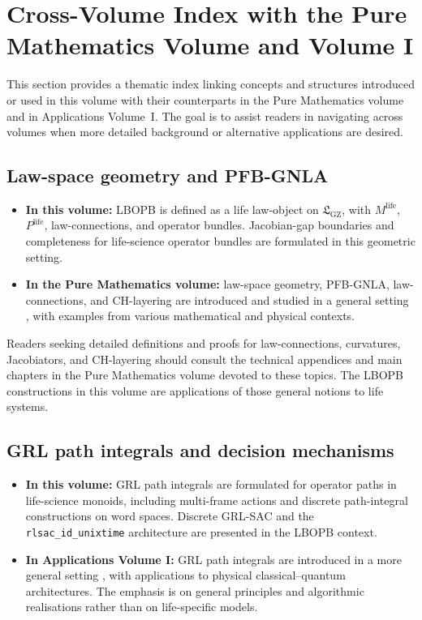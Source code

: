 \documentclass[11pt]{book}
\theoremstyle{plain}
\theoremstyle{definition}
\theoremstyle{remark}
\newcommand{\GZLS}{\ensuremath{\mathfrak{L}_{\mathrm{GZ}}}}       \newcommand{\GZLT}{\ensuremath{M_{!w}}}                           \newcommand{\GZLOC}{\ensuremath{A_M}}                             \newcommand{\GZLCurv}{\ensuremath{\mathcal{F}_{\mathrm{law}}}}
\begin{document}
\section{Cross-Volume Index with the Pure Mathematics Volume and Volume I}


This section provides a thematic index linking concepts and structures
introduced or used in this volume with their counterparts in the Pure
Mathematics volume and in Applications Volume~I. The goal is to assist
readers in navigating across volumes when more detailed background or
alternative applications are desired.

\subsection*{Law-space geometry and PFB-GNLA}

\begin{itemize}
  \item \textbf{In this volume:}
        LBOPB is defined as a life law-object on $\GZLS$, with
        $M^{\mathrm{life}}$, $P^{\mathrm{life}}$, law-connections,
        and operator bundles. Jacobian-gap boundaries and completeness
        for life-science operator bundles are formulated in this
        geometric setting.
  \item \textbf{In the Pure Mathematics volume:}
        law-space geometry, PFB-GNLA, law-connections, and CH-layering
        are introduced and studied in a general setting
        \cite{GaoZheng2025GFramework}, with examples from various
        mathematical and physical contexts.
\end{itemize}

Readers seeking detailed definitions and proofs for law-connections,
curvatures, Jacobiators, and CH-layering should consult the technical
appendices and main chapters in the Pure Mathematics volume devoted to
these topics. The LBOPB constructions in this volume are applications
of those general notions to life systems.

\subsection*{GRL path integrals and decision mechanisms}

\begin{itemize}
  \item \textbf{In this volume:}
        GRL path integrals are formulated for operator paths in
        life-science monoids, including multi-frame actions and
        discrete path-integral constructions on word spaces. Discrete
        GRL-SAC and the \texttt{rlsac\_id\_unixtime} architecture are
        presented in the LBOPB context.
  \item \textbf{In Applications Volume I:}
        GRL path integrals are introduced in a more general
        setting \cite{GaoZhengAppVol1}, with applications to physical
        classical–quantum architectures. The emphasis is on general
        principles and algorithmic realisations rather than on
        life-specific models.
\end{itemize}
\end{document}
